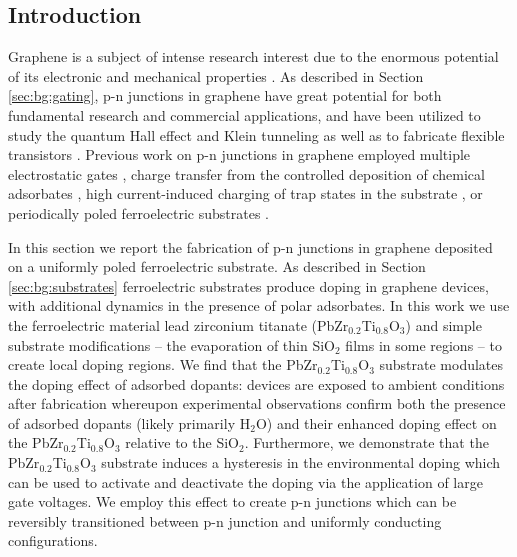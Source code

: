 \documentclass[edeposit,fullpage,draftthesis]{uiucthesis2009}
\begin{document}
    \subsection{Introduction}
    
        Graphene is a subject of intense research interest due to the enormous potential of its 
        electronic and mechanical properties \cite{geim2007rise}. As described in Section
        \ref{sec:bg:gating}, p-n junctions 
        in graphene have great potential for both fundamental research and commercial applications, 
        and have been utilized to study the quantum Hall effect \cite{williams2007quantum, Ozyilmaz2007, Velasco2010} 
        and Klein tunneling \cite{Stander2009, Young2009} as well as to fabricate flexible 
        transistors \cite{Kim2010}. Previous work on p-n junctions in graphene employed multiple electrostatic gates 
        \cite{Meric2008, williams2007quantum, Ozyilmaz2007, Huard2007, Liu2008, Stander2009, Velasco2009, Velasco2010, Young2009}, 
        charge transfer from the controlled deposition of chemical adsorbates 
        \cite{Farmer2009,Lohmann2009,Brenner2010,Cheng2011,Sojoudi2012,Seo2014,Park2015}, 
        high current-induced charging of trap states in the substrate \cite{Chiu2010}, 
        or periodically poled ferroelectric substrates \cite{Baeumer2015}.

        In this section we report the fabrication of p-n junctions in graphene deposited on a uniformly 
        poled ferroelectric substrate. As described in Section \ref{sec:bg:substrates}
        ferroelectric substrates produce doping in graphene devices, with additional dynamics
        in the presence of polar adsorbates. In this work we use the ferroelectric material lead zirconium titanate
        (PbZr$_{0.2}$Ti$_{0.8}$O$_3$) and simple substrate modifications -- the evaporation 
        of thin SiO$_2$ films in some regions -- to create local doping regions.
        We find that the PbZr$_{0.2}$Ti$_{0.8}$O$_3$ substrate modulates the doping effect of adsorbed dopants: 
        devices are exposed to ambient conditions after fabrication whereupon experimental observations 
        confirm both the presence of adsorbed dopants (likely primarily H$_2$O) and their enhanced doping
        effect on the PbZr$_{0.2}$Ti$_{0.8}$O$_3$ relative to the SiO$_2$.
        Furthermore, we demonstrate that the PbZr$_{0.2}$Ti$_{0.8}$O$_3$ substrate induces a hysteresis 
        in the environmental doping which can be used to activate and deactivate the doping via the 
        application of large gate voltages. We employ this effect to create p-n junctions which can 
        be reversibly transitioned between p-n junction and uniformly conducting configurations.
     
\end{document}
